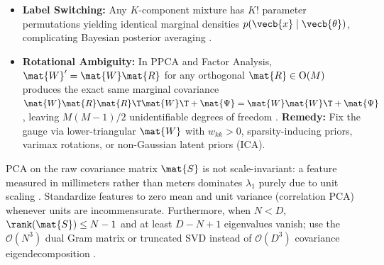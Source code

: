 \documentclass[../../../../master.tex]{subfiles}
\begin{document}
\begin{pitfall}
\label{pit:em:identifiability}
\begin{itemize}
  \item \textbf{Label Switching:} Any $K$-component mixture has $K!$ parameter permutations yielding identical marginal densities $p(\vecb{x}\mid\vecb{\theta})$, complicating Bayesian posterior averaging .
  \item \textbf{Rotational Ambiguity:} In PPCA and Factor Analysis, $\mat{W}' = \mat{W}\mat{R}$ for any orthogonal $\mat{R} \in \mathrm{O}(M)$ produces the exact same marginal covariance $\mat{W}\mat{R}\mat{R}\T\mat{W}\T + \mat{\Psi} = \mat{W}\mat{W}\T + \mat{\Psi}$, leaving $M(M-1)/2$ unidentifiable degrees of freedom . \textbf{Remedy:} Fix the gauge via lower-triangular $\mat{W}$ with $w_{kk} > 0$, sparsity-inducing priors, varimax rotations, or non-Gaussian latent priors (ICA).
\end{itemize}
\end{pitfall}

\begin{pitfall}
\label{pit:em:scale_rank}
PCA on the raw covariance matrix $\mat{S}$ is not scale-invariant: a feature measured in millimeters rather than meters dominates $\lambda_1$ purely due to unit scaling . Standardize features to zero mean and unit variance (correlation PCA) whenever units are incommensurate. Furthermore, when $N < D$, $\rank(\mat{S}) \le N - 1$ and at least $D - N + 1$ eigenvalues vanish; use the $\mathcal{O}(N^3)$ dual Gram matrix or truncated SVD instead of $\mathcal{O}(D^3)$ covariance eigendecomposition .
\end{pitfall}
\end{document}

